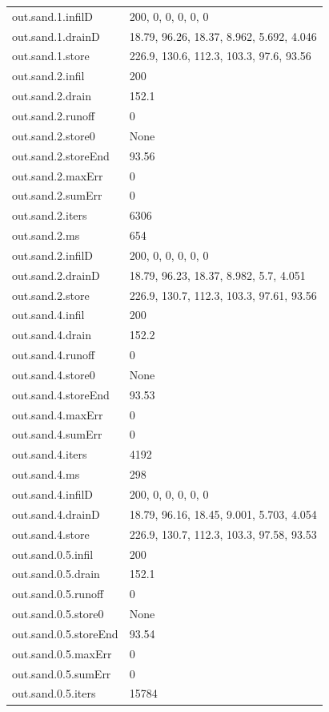 {\begin{longtable}{p{}p{}}
{}out.sand.1.infilD & 200, 0, 0, 0, 0, 0\\
{}out.sand.1.drainD & 18.79, 96.26, 18.37, 8.962, 5.692, 4.046\\
{}out.sand.1.store & 226.9, 130.6, 112.3, 103.3, 97.6, 93.56\\
{}out.sand.2.infil & 200\\
{}out.sand.2.drain & 152.1\\
{}out.sand.2.runoff & 0\\
{}out.sand.2.store0 & None\\
{}out.sand.2.storeEnd & 93.56\\
{}out.sand.2.maxErr & 0\\
{}out.sand.2.sumErr & 0\\
{}out.sand.2.iters & 6306\\
{}out.sand.2.ms & 654\\
{}out.sand.2.infilD & 200, 0, 0, 0, 0, 0\\
{}out.sand.2.drainD & 18.79, 96.23, 18.37, 8.982, 5.7, 4.051\\
{}out.sand.2.store & 226.9, 130.7, 112.3, 103.3, 97.61, 93.56\\
{}out.sand.4.infil & 200\\
{}out.sand.4.drain & 152.2\\
{}out.sand.4.runoff & 0\\
{}out.sand.4.store0 & None\\
{}out.sand.4.storeEnd & 93.53\\
{}out.sand.4.maxErr & 0\\
{}out.sand.4.sumErr & 0\\
{}out.sand.4.iters & 4192\\
{}out.sand.4.ms & 298\\
{}out.sand.4.infilD & 200, 0, 0, 0, 0, 0\\
{}out.sand.4.drainD & 18.79, 96.16, 18.45, 9.001, 5.703, 4.054\\
{}out.sand.4.store & 226.9, 130.7, 112.3, 103.3, 97.58, 93.53\\
{}out.sand.0.5.infil & 200\\
{}out.sand.0.5.drain & 152.1\\
{}out.sand.0.5.runoff & 0\\
{}out.sand.0.5.store0 & None\\
{}out.sand.0.5.storeEnd & 93.54\\
{}out.sand.0.5.maxErr & 0\\
{}out.sand.0.5.sumErr & 0\\
{}out.sand.0.5.iters & 15784\\

\end{longtable}}

